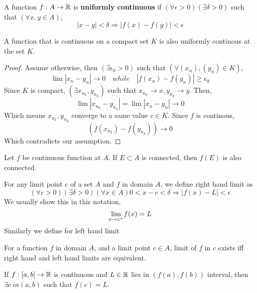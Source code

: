 \begin{definition}
    A function $f:A \to {\mathbb{R}}$ is \textbf{uniformly continuous} if $(\forall \epsilon >0)( \exists \delta >0)$ such that $(\forall x, y \in A)$,
    \[ |x-y| < \delta \Rightarrow |f(x) -f(y)| < \epsilon\]
\end{definition}
\begin{theorem}
    A function that is continuous on a compact set $K$ is also uniformly continous at the set $K$.
    \begin{proof}
        Assume otherwise, then $(\exists \epsilon_0 > 0)$ such that $(\forall (x_n),(y_n) \in K)$,
        \[ \lim |x_n - y_n| \to 0 \quad while \quad |f(x_n) - f(y_n)| \ge \epsilon_0\]
        Since $K$ is compact, $(\exists x_{n_k}, y_{n_k})$ such that $x_{n_k} \to x, y_{n_k} \to y$. Then,
        \[ \lim |x_{n_k} - y_{n_k}| = \lim |x_n - y_n| \to 0\]
        Which means $x_{n_k},y_{n_k}$ converge to a same value $c \in K$. Since $f$ is continous,
        \[  (f(x_{n_k}) - f(y_{n_k})) \to 0\]
        Which contradicts our assumption.
    \end{proof}
\end{theorem}

\begin{theorem} Let $f$ be continuous function at $A$. If $E \subset A$ is connected, then $f(E)$ is also connected.
\end{theorem}

\begin{definition} For any limit point $c$ of a set $A$ and $f$ in domain $A$, we define right hand limit as
    \[ (\forall \epsilon >0) (\exists \delta > 0)(\forall x \in A) 0 < x-c < \delta \Rightarrow |f(x) - L| < \epsilon\]
    We usually show this in this notation,
    \[ \underset{x \to c^{+}}{\lim} f(x) = L\]
    Similarly we define for left hand limit
\end{definition}

\begin{theorem} For a function $f$ in domain $A$, and a limit point $c \in A$, limit of $f$ in $c$ exists iff  right hand and left hand limits are equivalent.
\end{theorem}



\begin{theorem} If $f: [a,b] \to {\mathbb{R}}$ is continuous and $L \in {\mathbb{R}}$ lies in $(f(a), f(b))$ interval, then $\exists c\ in (a,b)$ such that $f(c) = L$.
\end{theorem}


